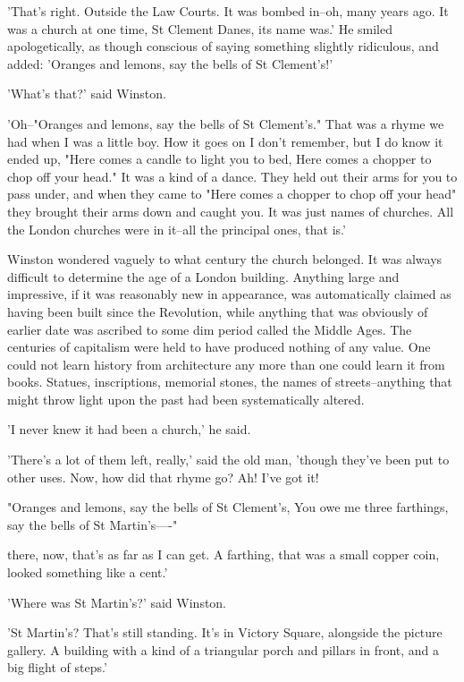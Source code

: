 \documentclass{article}
\begin{document}
'That's right. Outside the Law Courts. It was bombed in--oh, many years
ago. It was a church at one time, St Clement Danes, its name was.' He
smiled apologetically, as though conscious of saying something slightly
ridiculous, and added: 'Oranges and lemons, say the bells of St Clement's!'

'What's that?' said Winston.

'Oh--"Oranges and lemons, say the bells of St Clement's." That was a rhyme
we had when I was a little boy. How it goes on I don't remember, but I do
know it ended up, "Here comes a candle to light you to bed, Here comes a
chopper to chop off your head." It was a kind of a dance. They held out
their arms for you to pass under, and when they came to "Here comes a
chopper to chop off your head" they brought their arms down and caught you.
It was just names of churches. All the London churches were in it--all the
principal ones, that is.'

Winston wondered vaguely to what century the church belonged. It was always
difficult to determine the age of a London building. Anything large and
impressive, if it was reasonably new in appearance, was automatically
claimed as having been built since the Revolution, while anything that was
obviously of earlier date was ascribed to some dim period called the Middle
Ages. The centuries of capitalism were held to have produced nothing of any
value. One could not learn history from architecture any more than one
could learn it from books. Statues, inscriptions, memorial stones, the
names of streets--anything that might throw light upon the past had been
systematically altered.

'I never knew it had been a church,' he said.

'There's a lot of them left, really,' said the old man, 'though they've
been put to other uses. Now, how did that rhyme go? Ah! I've got it!


  "Oranges and lemons, say the bells of St Clement's,
  You owe me three farthings, say the bells of St Martin's----"


there, now, that's as far as I can get. A farthing, that was a small copper
coin, looked something like a cent.'

'Where was St Martin's?' said Winston.

'St Martin's? That's still standing. It's in Victory Square, alongside the
picture gallery. A building with a kind of a triangular porch and pillars
in front, and a big flight of steps.'
\end{document}
